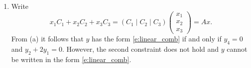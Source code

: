 \documentclass{ximera}
\begin{document}
\begin{exercise}
\begin{solution}
\begin{enumerate}[label=(\alph*)]
(ii,iii)  Solutions can exist only if  $b_4 = 0$ and $b_2 + 2b_1 = 0$. Then the system $Ax = b$  simplifies to 
\[
\left(\begin{array}{ccc|c}
1 & 0 & -1 & b_1\\  
0 & 1 & -2 & b_3 \\ 
0 & 0 & 0 & 0\\ 
0 & 0 & 0 & 0
\end{array}\right)\ldotp
\]
Solving this system, one finds that solutions have the form   
\[
x_1 = x_3 + b_1 \AND x_2 = 2x_3 + b_3.
\] 
Thus, when there are any solutions to $Ax=b$, there are infinitely many solutions (one for each value of $x_3$).  So (ii) is the empty set and (iii) is the set  $b_4=0$ and $b_2 + 2b_1 = 0$.

\item  Write
\[
x_1C_1 + x_2C_2 + x_3C_3 = (C_1\mid C_2\mid C_3)\left(\begin{array}{c} x_1\\x_2\\x_3 \end{array}\right) = Ax. 
\]
From (a) it follows that $y$ has the form \eqref{e:linear_comb}
 if and only if $y_4 = 0$ and $y_2 + 2y_1 = 0$. However, the second constraint does not hold and $y$ cannot be written in the form \eqref{e:linear_comb}.
\end{enumerate}
\end{solution}
\end{exercise}
\end{document}
